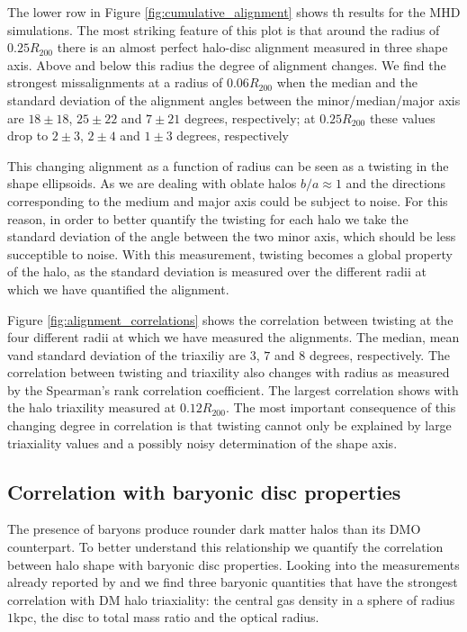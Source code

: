 \documentclass[usenatbib]{mnras}
\begin{document}
The lower row in Figure \ref{fig:cumulative_alignment} shows th
results for the MHD simulations.
The most striking feature of this plot is that around the radius of
$0.25R_{200}$ there is an almost perfect halo-disc alignment measured
in three shape axis.
Above and below this radius the degree of alignment changes.
We find the strongest missalignments at a radius of $0.06R_{200}$ when
the median and the standard deviation of the alignment angles between
the minor/median/major axis are $18\pm18$, $25\pm22$ and $7\pm21$
degrees, respectively;  at $0.25R_{200}$ these values drop to $2\pm3$,
$2\pm4$ and $1\pm 3$ degrees, respectively

This changing alignment as a function of radius can be seen as a
twisting in the shape ellipsoids. 
As we are dealing with oblate halos $b/a\approx 1$ and the
directions corresponding to the medium and major axis could be subject
to noise.
For this reason, in order to better quantify the twisting for each
halo we take the standard deviation of the angle between the two minor
axis, which should be less succeptible to noise.
With this measurement, twisting becomes a global property of the halo,
as the standard deviation is measured over the different radii at
which we have quantified the alignment.

Figure \ref{fig:alignment_correlations} shows the correlation between
twisting at the four different radii at which we have measured the
alignments. 
The median, mean vand standard deviation of the triaxiliy are $3$, $7$ and $8$
degrees, respectively.
The correlation between twisting and triaxility also changes with
radius as measured by the Spearman's rank correlation coefficient.
The largest correlation shows with the halo triaxility measured at
$0.12R_{200}$. 
The most important consequence of this changing degree in correlation
is that twisting cannot only be explained by large triaxiality values
and a possibly noisy determination of the shape axis.

\subsection{Correlation with baryonic disc properties}


The presence of baryons produce rounder dark matter halos than its DMO
counterpart.
To better understand this relationship we quantify the correlation
between halo shape with baryonic disc properties.  
Looking into the measurements already reported by \cite{auriga} and
\cite{Pakmor17} we find three baryonic quantities that have the
strongest correlation with DM halo triaxiality: the central gas
density in a sphere of radius $1$kpc, the disc to total mass ratio and
the optical radius. 
\end{document}
